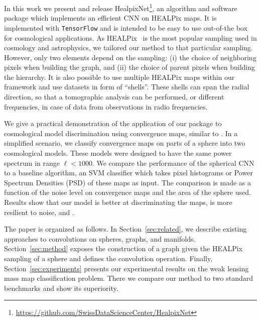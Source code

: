 \documentclass[final,twocolumn,3p,times,authoryear]{elsarticle}
\newcommand{\nati}[1]{{\color[rgb]{.1,.6,.1}{#1}}}
\newcommand{\todo}[1]{{\color[rgb]{.6,.1,.6}{#1}}}
\newcommand{\secref}[1]{Section~\ref{sec:#1}}
\newcommand{\1}{\b{1}}              %
\newcommand{\0}{\b{0}}              %
\newcommand{\pkg}[1]{\texttt{#1}}
\begin{document}
In this work we present and release HealpixNet\footnote{\url{https://github.com/SwissDataScienceCenter/HealpixNet}}, an algorithm and software package which implements an efficient CNN on HEALPix maps. It is implemented with \pkg{TensorFlow} \citep{abadi2016tensorflow} and is intended to be easy to use out-of-the box for cosmological applications.
As HEALPix~\citep{gorski2005healpix} is the most popular sampling used in cosmology and astrophysics, we tailored our method to that particular sampling. However, only two elements depend on the sampling: (i) the choice of neighboring pixels when building the graph, and (ii) the choice of parent pixels when building the hierarchy.
It is also possible to use multiple HEALPix maps within our framework and use datasets in form of ``shells''. These shells can span the radial direction, so that a tomographic analysis can be performed, or different frequencies, in case of data from observations in radio frequencies.


We give a practical demonstration of the application of our package to cosmological model discrimination using convergence maps, similar to \citep{schmelze2017cosmologicalmodel}.
In a simplified scenario, we classify convergence maps on parts of a sphere into two cosmological models.
These models were designed to have the same power spectrum in range $\ell < 1000$.
We compare the performance of the spherical CNN to a baseline algorithm, an SVM classifier which takes pixel histograms or Power Spectrum Densities (PSD) of these maps as input.
The comparison is made as a function of the noise level on convergence maps and the area of the sphere used. Results show that our model is better at discriminating the maps, is more resilient to noise, and \todo{is faster?}.
\nati{I do not think we should argue for speed gain in this paper. We are probably much more efficient than scnns with the convolution done in the spectral domain. However compared to tradiational methods, we are in most of the cases slower.}


The paper is organized as follows.
In \secref{related}, we describe existing approaches to convolutions on spheres, graphs, and manifolds.
\secref{method} exposes the construction of a graph given the HEALPix sampling of a sphere and defines the convolution operation.
Finally, \secref{experiments} presents our experimental results on the weak lensing mass map classification problem. There we compare our method to two standard benchmarks and show its superiority.
\end{document}
